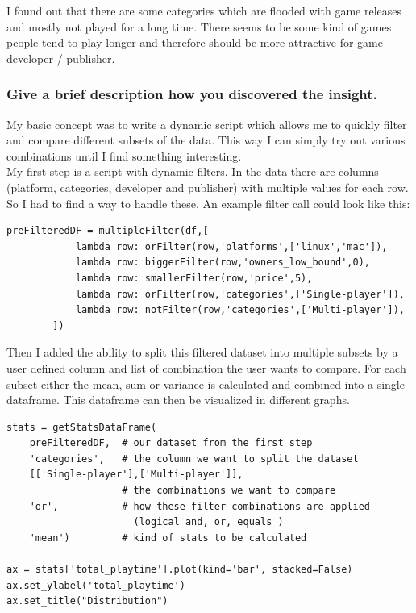\documentclass[11pt]{article}
\begin{document}
I found out that there are some categories which are flooded with game releases and mostly not played for a long time. There seems to be some kind of games people tend to play longer and therefore should be more attractive for game developer / publisher. 

\subsubsection{Give a brief description how you discovered the
insight.}

My basic concept was to write a dynamic script which allows me to quickly filter and compare different subsets of the data. This way I can simply try out various combinations until I find something interesting.\\
My first step is a script with dynamic filters. In the data there are columns (platform, categories, developer and publisher) with multiple values for each row. So I had to find a way to handle these. An example filter call could look like this:\\
\begin{minipage}{\linewidth}
\begin{lstlisting}
preFilteredDF = multipleFilter(df,[
            lambda row: orFilter(row,'platforms',['linux','mac']),
            lambda row: biggerFilter(row,'owners_low_bound',0),
            lambda row: smallerFilter(row,'price',5),
            lambda row: orFilter(row,'categories',['Single-player']),
            lambda row: notFilter(row,'categories',['Multi-player']),
        ])
\end{lstlisting}
\end{minipage}

Then I added the ability to split this filtered dataset into multiple subsets by a user defined column and list of combination the user wants to compare. For each subset either the mean, sum or variance is calculated and combined into a single dataframe. This dataframe can then be visualized in different graphs.

\begin{minipage}{\linewidth}
    \begin{lstlisting}
stats = getStatsDataFrame(
    preFilteredDF,  # our dataset from the first step
    'categories',   # the column we want to split the dataset
    [['Single-player'],['Multi-player']],
                    # the combinations we want to compare
    'or',           # how these filter combinations are applied 
                      (logical and, or, equals )
    'mean')         # kind of stats to be calculated

ax = stats['total_playtime'].plot(kind='bar', stacked=False)
ax.set_ylabel('total_playtime')
ax.set_title("Distribution")
    \end{lstlisting}
\end{minipage}
\end{document}
